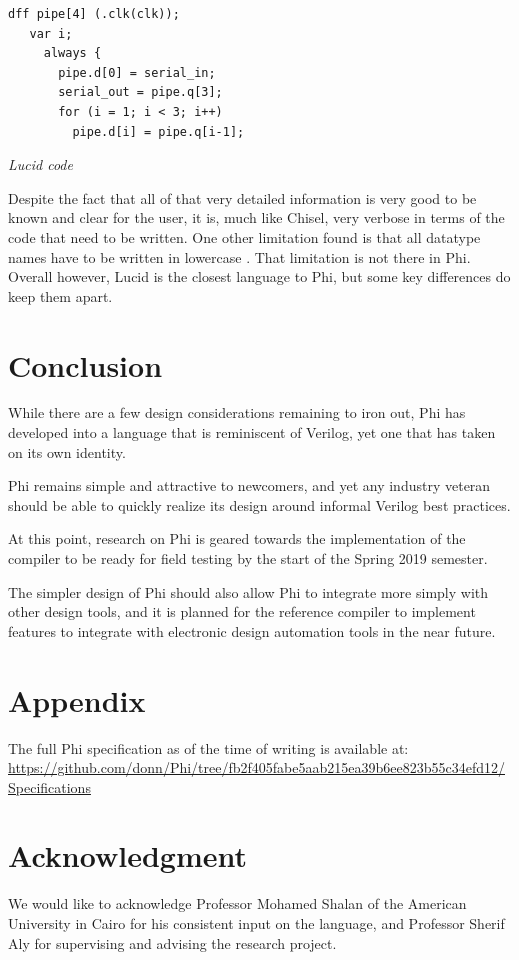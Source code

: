 \documentclass[10pt, two column]{article}
\theoremstyle{definition}
\begin{document}
\begin{lstlisting}
dff pipe[4] (.clk(clk));
   var i;
     always {
       pipe.d[0] = serial_in;
       serial_out = pipe.q[3];
       for (i = 1; i < 3; i++)
         pipe.d[i] = pipe.q[i-1];
\end{lstlisting}
\begin{center}
\textit{Lucid code}
\end{center}

Despite the fact that all of that very detailed information is very good to be known and clear for the user, it is, much like Chisel, very verbose in terms of the code that need to be written. One other limitation found is that all datatype names have to be written in lowercase \cite{withMojoAndLucid_2017}. That limitation is not there in Phi. Overall however, Lucid is the closest language to Phi, but some key differences do keep them apart.

\section{Conclusion}
While there are a few design considerations remaining to iron out, Phi has developed into a language that is reminiscent of Verilog, yet one that has taken on its own identity.\newline

Phi remains simple and attractive to newcomers, and yet any industry veteran should be able to quickly realize its design around informal Verilog best practices.\newline

At this point, research on Phi is geared towards the implementation of the compiler to be ready for field testing by the start of the Spring 2019 semester.\newline

The simpler design of Phi should also allow Phi to integrate more simply with other design tools, and it is planned for the reference compiler to implement features to integrate with electronic design automation tools in the near future.

\section*{Appendix}
The full Phi specification as of the time of writing is available at: \url{https://github.com/donn/Phi/tree/fb2f405fabe5aab215ea39b6ee823b55c34efd12/Specifications}

\section*{Acknowledgment}
We would like to acknowledge Professor Mohamed Shalan of the American University in Cairo for his consistent input on the language, and Professor Sherif Aly for supervising and advising the research project.



\end{document}
